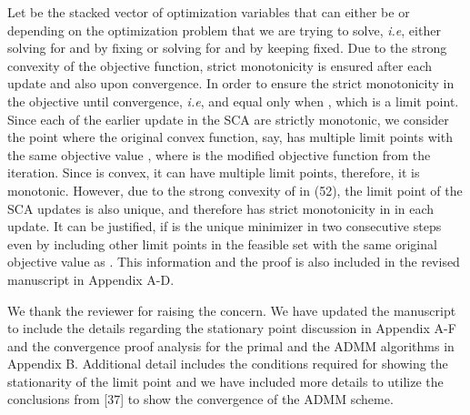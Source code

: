 \begin{enumerate}
Let  be the stacked vector of optimization variables that can either be  or  depending on the optimization problem that we are trying to solve, \textit{i.e}, either solving for \eqn{\mx} and \eqn{\mz} by fixing  or solving for \eqn{\my} and \eqn{\mz} by keeping  fixed. Due to the strong convexity of the objective function, strict monotonicity is ensured after each update and also upon convergence. In order to ensure the strict monotonicity in the objective until convergence, \textit{i.e},  and equal only when , which is a limit point. Since each of the earlier update in the \ac{SCA} are strictly monotonic, we consider the point where the original convex function, say,  has multiple limit points with the same objective value , where  is the modified objective function from the  iteration. Since  is convex, it can have multiple limit points, therefore, it is monotonic. However, due to the strong convexity of  in (52), the limit point of the \ac{SCA} updates is also unique, and therefore has strict monotonicity in  in each update. It can be justified, if  is the unique minimizer in two consecutive steps even by including other limit points in the feasible set  with the same original objective value as . This information and the proof is also included in the revised manuscript in Appendix A-D.

 

\resp We thank the reviewer for raising the concern. We have updated the manuscript to include the details regarding the stationary point discussion in Appendix A-F and the convergence proof analysis for the primal and the \ac{ADMM} algorithms in Appendix B. Additional detail includes the conditions required for showing the stationarity of the limit point and we have included more details to utilize the conclusions from [37] to show the convergence of the ADMM scheme.

\end{enumerate}
